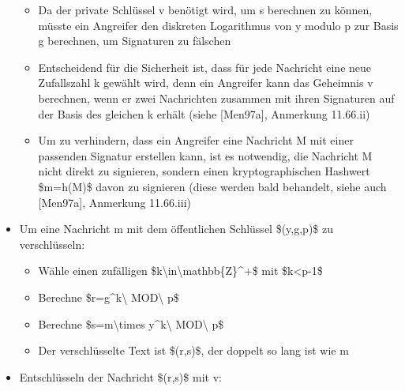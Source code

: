 \documentclass[a4paper]{article}
\begin{document}
\begin{multicols}{3}
\begin{itemize}
              \begin{itemize}
                  \item
                        Da der private Schlüssel v benötigt wird, um s berechnen zu können,
                        müsste ein Angreifer den diskreten Logarithmus von y modulo p zur
                        Basis g berechnen, um Signaturen zu fälschen
                  \item
                        Entscheidend für die Sicherheit ist, dass für jede Nachricht eine
                        neue Zufallszahl k gewählt wird, denn ein Angreifer kann das
                        Geheimnis v berechnen, wenn er zwei Nachrichten zusammen mit ihren
                        Signaturen auf der Basis des gleichen k erhält (siehe {[}Men97a{]},
                        Anmerkung 11.66.ii)
                  \item
                        Um zu verhindern, dass ein Angreifer eine Nachricht M mit einer
                        passenden Signatur erstellen kann, ist es notwendig, die Nachricht M
                        nicht direkt zu signieren, sondern einen kryptographischen Hashwert
                        \$m=h(M)\$ davon zu signieren (diese werden bald behandelt, siehe
                        auch {[}Men97a{]}, Anmerkung 11.66.iii)
              \end{itemize}
        \item
              Um eine Nachricht m mit dem öffentlichen Schlüssel \$(y,g,p)\$ zu
              verschlüsseln:

              \begin{itemize}
                  \item
                        Wähle einen zufälligen
                        \$k\textbackslash in\textbackslash mathbb\{Z\}\^{}+\$ mit
                        \$k\textless p-1\$
                  \item
                        Berechne \$r=g\^{}k\textbackslash{} MOD\textbackslash{} p\$
                  \item
                        Berechne \$s=m\textbackslash times y\^{}k\textbackslash{}
                        MOD\textbackslash{} p\$
                  \item
                        Der verschlüsselte Text ist \$(r,s)\$, der doppelt so lang ist wie m
              \end{itemize}
        \item
              Entschlüsseln der Nachricht \$(r,s)\$ mit v:


\end{itemize}
\end{multicols}
\end{document}
